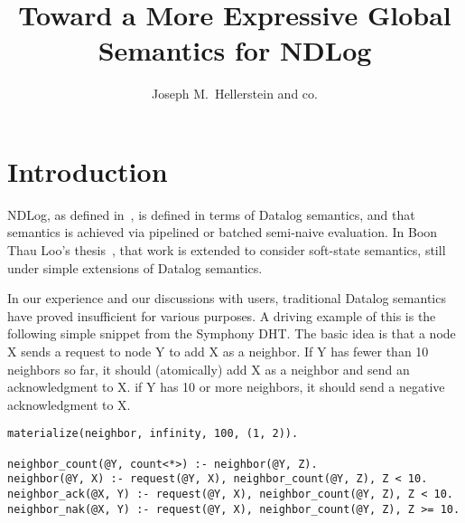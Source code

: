 \documentclass{article}
\begin{document}
\title{Toward a More Expressive Global Semantics for NDLog}

\author{Joseph M.\ Hellerstein and co.}

\date{}

\maketitle
\begin{abstract}
\end{abstract}
\section{Introduction}
NDLog, as defined in~\cite{loo-sigmod06}, is defined in terms of
Datalog semantics, and that semantics is achieved via pipelined or
batched semi-naive evaluation.  In Boon Thau Loo's
thesis~\cite{loothesis}, that work is extended to consider soft-state
semantics, still under simple extensions of Datalog semantics.

In our experience and our discussions with users, traditional Datalog
semantics have proved insufficient for various purposes.  A driving
example of this is the following simple snippet from the Symphony
DHT.  The basic idea is that a node X sends a request to node Y to add
X as a neighbor.  If Y has fewer than 10 neighbors so far, it should
(atomically) add X as a neighbor and send an acknowledgment to X.  if
Y has 10 or more neighbors, it should send a negative acknowledgment
to X.

\begin{lstlisting}
materialize(neighbor, infinity, 100, (1, 2)).

neighbor_count(@Y, count<*>) :- neighbor(@Y, Z).
neighbor(@Y, X) :- request(@Y, X), neighbor_count(@Y, Z), Z < 10.
neighbor_ack(@X, Y) :- request(@Y, X), neighbor_count(@Y, Z), Z < 10.
neighbor_nak(@X, Y) :- request(@Y, X), neighbor_count(@Y, Z), Z >= 10.
\end{lstlisting}
\end{document}
